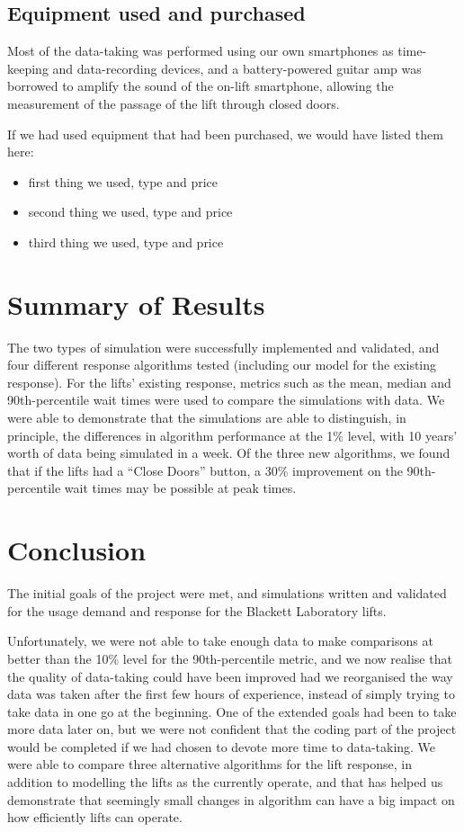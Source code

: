 \documentclass[12pt,a4paper,onecolumn]{Imperial_lab_report}
\begin{document}
\subsection{Equipment used and purchased}
Most of the data-taking was performed using our own smartphones as time-keeping and data-recording devices, and a battery-powered guitar amp was borrowed to amplify the sound of the on-lift smartphone, allowing the measurement of the passage of the lift through closed doors.

If we had used equipment that had been purchased, we would have listed them here:
\begin{itemize}
  \item first thing we used, type and price
  \item second thing we used, type and price
  \item third thing we used, type and price
\end{itemize}

\section{Summary of Results} %
The two types of simulation were successfully implemented and validated, and four different response algorithms tested (including our model for the existing response). For the lifts' existing response, metrics such as the mean, median and 90th-percentile wait times were used to  compare the simulations with data.
We were able to demonstrate that the simulations are able to distinguish, in principle, the differences in algorithm performance at the 1\% level, with 10 years' worth of data being simulated in a week.
Of the three new algorithms, we found that if the lifts had a ``Close Doors'' button, a 30\% improvement on the 90th-percentile wait times may be possible at peak times.

\section{Conclusion} 
The initial goals of the project were met, and simulations written and validated for the usage demand and response for the Blackett Laboratory lifts.

Unfortunately, we were not able to take enough data to make comparisons at better than the 10\% level for the 90th-percentile metric, and we now realise that the quality of data-taking could have been improved had we reorganised the way data was taken after the first few hours of experience, instead of simply trying to take data in one go at the beginning.
One of the extended goals had been to take more data later on, but we were not confident that the coding part of the project would be completed if we had chosen to devote more time to data-taking.
We were able to compare three alternative algorithms for the lift response, in addition to modelling the lifts as the currently operate, and that has helped us demonstrate that seemingly small changes in algorithm can have a big impact on how efficiently lifts can operate.
\end{document}
